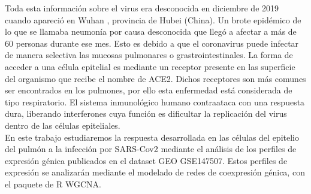 \documentclass{article}
\begin{document}
		\noindent Toda esta información sobre el virus era desconocida en diciembre de 2019 cuando apareció en Wuhan , provincia de Hubei (China). Un brote epidémico de lo que se llamaba neumonía por causa desconocida que llegó a afectar a más de 60 personas durante ese mes. Esto es debido a que el coronavirus puede infectar de manera selectiva las mucosas pulmonares o grastrointestinales. La forma de acceder a una célula epitelial es mediante un receptor presente en las superficie del organismo que recibe el nombre de ACE2. Dichos receptores son más comunes ser encontrados en los pulmones, por ello esta enfermedad está considerada de tipo respiratorio. El sistema inmunológico humano contraataca con una respuesta dura, liberando interferones cuya función es dificultar la replicación del virus dentro de las células epiteliales.\\
		
		
		\noindent En este trabajo estudiaremos la respuesta desarrollada en las células del epitelio del pulmón a la infección por SARS-Cov2 mediante el análisis de los perfiles de expresión génica publicados en el dataset GEO GSE147507. Estos perfiles de expresión se analizarán mediante el modelado de redes de coexpresión génica, con el paquete de R WGCNA.
		
\end{document}
